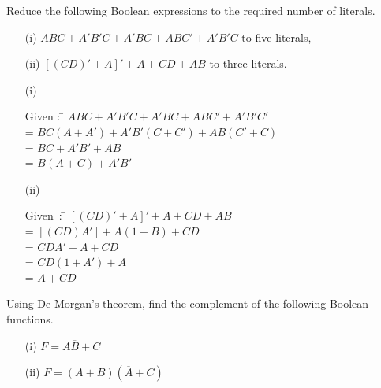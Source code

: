 \begin{problem}\label{prob5.62}
Reduce the following Boolean expressions to the required number of literals.
\begin{itemize}
\item[(i)] $ABC+A'B'C+A'BC+ABC'+A'B'C$ to five literals,

\item[(ii)] $[(CD)'+A]'+A+CD+AB$ to three literals.
\end{itemize}
\end{problem}

\begin{solution}
\begin{itemize}
\item[(i)] 
\begin{tabbing}
\phantom{AAAAAA} Given : \= $ABC+A'B'C+A'BC+ABC'+A'B'C'$\\[3pt]
        \>= $BC(A+A')+A'B'(C+C')+AB(C'+C)$\\[3pt]
        \>= $BC+A'B'+AB$\\[3pt]
        \>= $B(A+C)+A'B'$
\end{tabbing}

\item[(ii)] 
\begin{tabbing}
Given~: \= $[(CD)'+A]'+A+CD+AB$\\[3pt]
        \>= $[(CD)A']+A(1+B)+CD$\\[3pt]
        \>= $CDA'+A+CD$\\[3pt]
        \>= $CD(1+A')+A$\\[3pt]
        \>= $A+CD$
\end{tabbing}
\end{itemize}
\end{solution}

\begin{problem}\label{prob5.63}
Using De-Morgan's theorem, find the complement of the following Boolean functions.
\begin{itemize}
\item[(i)] $F=A\overline{B}+C$

\item[(ii)] $F=(A+B)(\overline{A}+C)$
\end{itemize}
\end{problem}

